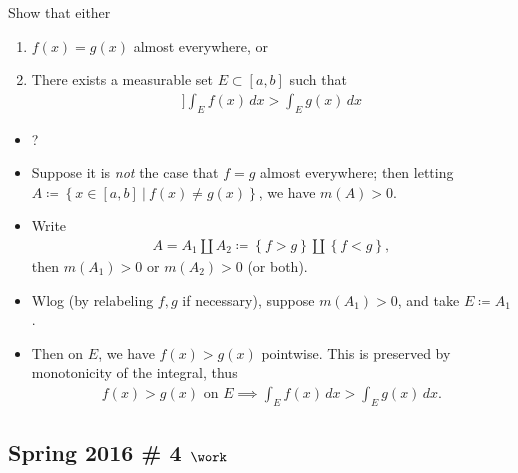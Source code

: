 Show that either

\begin{enumerate}
\def\labelenumi{\arabic{enumi}.}
\tightlist
\item
  \(f(x) = g(x)\) almost everywhere, or
\item
  There exists a measurable set \(E \subset [a, b]\) such that
  \begin{align*}]
  \int _{E} f(x) \, dx > \int _{E} g(x) \, dx
  \end{align*}
\end{enumerate}


\begin{solution}

\hfill

\begin{concept}

\hfill

\begin{itemize}
\tightlist
\item
  ?
\end{itemize}

\end{concept}

\begin{itemize}
\item
  Suppose it is \emph{not} the case that \(f=g\) almost everywhere; then
  letting
  \(A\coloneqq\left\{{x\in [a,b] {~\mathrel{\Big|}~}f(x) \neq g(x)}\right\}\),
  we have \(m(A) > 0\).
\item
  Write
  \begin{align*}  
  A = A_1{\coprod}A_2 \coloneqq\left\{{f>g}\right\} {\coprod}\left\{{f<g}\right\}
  ,\end{align*}
  then \(m(A_1) > 0\) or \(m(A_2) > 0\) (or both).
\item
  Wlog (by relabeling \(f, g\) if necessary), suppose \(m(A_1) > 0\),
  and take \(E\coloneqq A_1\).
\item
  Then on \(E\), we have \(f(x)>g(x)\) pointwise. This is preserved by
  monotonicity of the integral, thus
  \begin{align*}  
  f(x) > g(x) \text{ on } E \implies \int_{E} f(x)\,dx > \int_{E} g(x)\, dx 
  .\end{align*}
\end{itemize}

\end{solution}

\hypertarget{spring-2016-4-work}{%
\subsection{\texorpdfstring{Spring 2016 \# 4
\(\work\)}{Spring 2016 \# 4 \textbackslash work}}\label{spring-2016-4-work}}

